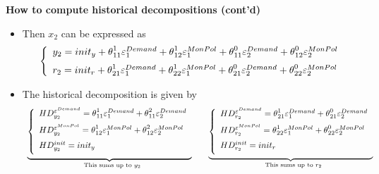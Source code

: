 
\begin{frame}
{\textbf{How to compute historical decompositions (cont'd)}}\bigskip

\begin{itemize}
\item Then $x_{2}$ can be expressed as 
\begin{equation*}
\left\{ 
\begin{array}{l}
y_{2}=init_{y}+\theta _{11}^{1}\varepsilon _{1}^{Demand}+\theta
_{12}^{1}\varepsilon _{1}^{MonPol}+\theta _{11}^{0}\varepsilon
_{2}^{Demand}+\theta _{12}^{0}\varepsilon _{2}^{MonPol}\medskip \\ 
r_{2}=init_{r}+\theta _{21}^{1}\varepsilon _{1}^{Demand}+\theta
_{22}^{1}\varepsilon _{1}^{MonPol}+\theta _{21}^{0}\varepsilon
_{2}^{Demand}+\theta _{22}^{0}\varepsilon _{2}^{MonPol}%
\end{array}%
\right.
\end{equation*}%
\pause

\item The historical decomposition is given by 
\begin{equation*}
\begin{array}{ccc}
\underset{\text{This sums up to }y_{2}}{\underbrace{\left\{ 
\begin{array}{l}
HD_{y_{2}}^{\varepsilon ^{Demand}}=\theta _{11}^{1}\varepsilon
_{1}^{Demand}+\theta _{11}^{2}\varepsilon _{2}^{Demand}\medskip \\ 
HD_{y_{2}}^{\varepsilon ^{MonPol}}=\theta _{12}^{1}\varepsilon
_{1}^{MonPol}+\theta _{12}^{2}\varepsilon _{2}^{MonPol}\medskip \\ 
HD_{y_{2}}^{init}=init_{y}\medskip%
\end{array}%
\right. }} &  & \underset{\text{This sums up to }r_{2}}{\underbrace{\left\{ 
\begin{array}{l}
HD_{r_{2}}^{\varepsilon ^{Demand}}=\theta _{21}^{1}\varepsilon
_{1}^{Demand}+\theta _{21}^{0}\varepsilon _{2}^{Demand}\medskip \\ 
HD_{r_{2}}^{\varepsilon ^{MonPol}}=\theta _{22}^{1}\varepsilon
_{1}^{MonPol}+\theta _{22}^{0}\varepsilon _{2}^{MonPol}\medskip \\ 
HD_{r_{2}}^{init}=init_{r}\medskip%
\end{array}%
\right. }}%
\end{array}%
\end{equation*}
\end{itemize}
\end{frame}

